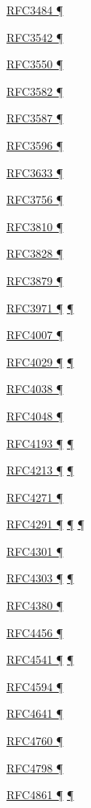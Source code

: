 \documentclass[
]{article}
\begin{document}
\hyperref[source-and-destination-address-selection]{RFC3484 ¶}

\hyperref[dual-stack-scenarios]{RFC3542 ¶}

\hyperref[transport-protocols]{RFC3550 ¶}

\hyperref[multihoming]{RFC3582 ¶}

\hyperref[addresses]{RFC3587 ¶}

\hyperref[dns]{RFC3596 ¶}

\hyperref[managed-configuration]{RFC3633 ¶}

\hyperref[layer-2-considerations]{RFC3756 ¶}

\hyperref[address-resolution]{RFC3810 ¶}

\hyperref[transport-protocols]{RFC3828 ¶}

\hyperref[addresses]{RFC3879 ¶}

\hyperref[security]{RFC3971 ¶} \hyperref[layer-2-considerations]{¶}

\hyperref[addresses]{RFC4007 ¶}

\hyperref[layer-2-functions]{RFC4029 ¶} \hyperref[tunnels]{¶}

\hyperref[addresses]{RFC4038 ¶}

\hyperref[addresses]{RFC4048 ¶}

\hyperref[filtering]{RFC4193 ¶} \hyperref[multihoming]{¶}

\hyperref[dual-stack-scenarios]{RFC4213 ¶} \hyperref[tunnels]{¶}

\hyperref[routing]{RFC4271 ¶}

\hyperref[address-resolution]{RFC4291 ¶} \hyperref[addresses]{¶}
\hyperref[filtering]{¶}

\hyperref[security]{RFC4301 ¶}

\hyperref[extension-headers-and-options]{RFC4303 ¶}
\hyperref[packet-format]{¶}

\hyperref[obsolete-techniques]{RFC4380 ¶}

\hyperref[routing]{RFC4456 ¶}

\hyperref[address-resolution]{RFC4541 ¶}
\hyperref[layer-2-considerations]{¶}

\hyperref[traffic-class-and-flow-label]{RFC4594 ¶}

\hyperref[filtering]{RFC4641 ¶}

\hyperref[routing]{RFC4760 ¶}

\hyperref[tunnels]{RFC4798 ¶}

\hyperref[address-resolution]{RFC4861 ¶}
\hyperref[auto-configuration]{¶}
\end{document}
